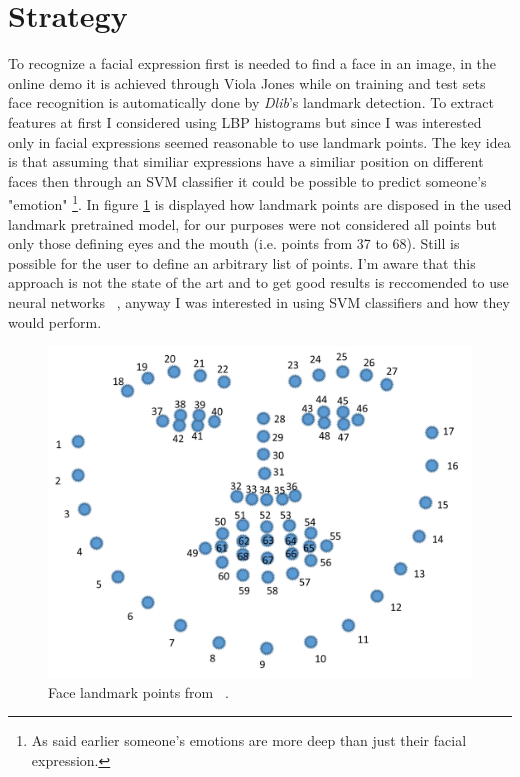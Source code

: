 \section{Strategy}
To recognize a facial expression first is needed to find a face in an image, in the online demo it is achieved through Viola Jones while on training and test sets face recognition is automatically done by \textit{Dlib}'s landmark detection.
To extract features at first I considered using LBP histograms but since I was interested only in facial expressions seemed reasonable to use landmark points. 
The key idea is that assuming that similiar expressions have a similiar position on different faces then through an SVM classifier it could be possible to predict someone's "emotion" \footnote{As said earlier someone's emotions are more deep than just their facial expression.}.
In figure \ref{fig:landmarks} is displayed how landmark points are disposed in the used landmark pretrained model, for our purposes were not considered all points but only those defining eyes and the mouth (i.e. points from 37 to 68).
Still is possible for the user to define an arbitrary list of points.
I'm aware that this approach is not the state of the art and to get good results is reccomended to use neural networks ~\cite{blog:emotion}, anyway I was interested in using SVM classifiers and how they would perform.

\begin{figure}[h!t]
    \centering
    \includegraphics[scale=0.2]{images/landmark.png}
    \caption{Face landmark points from ~\cite{landmark:guide}.}
    \label{fig:landmarks}
\end{figure}

